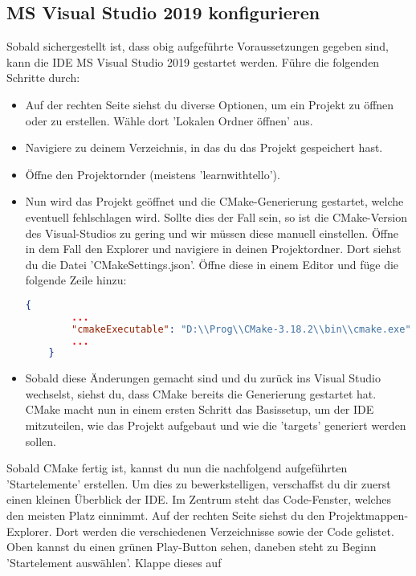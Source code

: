 \subsection{MS Visual Studio 2019 konfigurieren}
Sobald sichergestellt ist, dass obig aufgeführte Voraussetzungen gegeben sind, kann die IDE MS Visual Studio 2019
gestartet werden. Führe die folgenden Schritte durch:
\begin{itemize}
    \item Auf der rechten Seite siehst du diverse Optionen, um ein Projekt zu öffnen oder zu erstellen. Wähle dort
    'Lokalen Ordner öffnen' aus.
    \item Navigiere zu deinem Verzeichnis, in das du das Projekt gespeichert hast.
    \item Öffne den Projektornder (meistens 'learn\textunderscore with\textunderscore tello').
    \item Nun wird das Projekt geöffnet und die CMake-Generierung gestartet, welche eventuell fehlschlagen wird.
    Sollte dies der Fall sein, so ist die CMake-Version des Visual-Studios zu gering und wir müssen diese manuell
    einstellen. Öffne in dem Fall den Explorer und navigiere in deinen Projektordner. Dort siehst du die Datei 'CMakeSettings.json'.
    Öffne diese in einem Editor und füge die folgende Zeile hinzu:\\
    \begin{lstlisting}[language=json, basicstyle=\small]
    {
        ...
        "cmakeExecutable": "D:\\Prog\\CMake-3.18.2\\bin\\cmake.exe"
        ...
    }
    \end{lstlisting}
    \item Sobald diese Änderungen gemacht sind und du zurück ins Visual Studio wechselst, siehst du, dass CMake bereits
    die Generierung gestartet hat. CMake macht nun in einem ersten Schritt das Basissetup, um der IDE mitzuteilen,
    wie das Projekt aufgebaut und wie die 'targets' generiert werden sollen.
\end{itemize}
Sobald CMake fertig ist, kannst du nun die nachfolgend aufgeführten 'Startelemente' erstellen.
Um dies zu bewerkstelligen, verschaffst du dir zuerst einen kleinen Überblick der IDE. Im Zentrum steht das
Code-Fenster, welches den meisten Platz einnimmt. Auf der rechten Seite siehst du den Projektmappen-Explorer. Dort
werden die verschiedenen Verzeichnisse sowie der Code gelistet.
Oben kannst du einen grünen Play-Button sehen, daneben steht zu Beginn 'Startelement auswählen'. Klappe dieses auf
